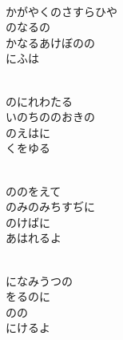 \documentclass[10pt,b5j]{tarticle} %
\begin{document}
\vspace{1.5em} %
\newcommand{\linespace}{0.5em} %
\newcommand{\blocksize}{0.5\hsize} %
\newcommand{\itemmargin}{6em} %
\begin{enumerate} %
    \setlength{\itemindent}{\itemmargin} %
    \begin{minipage}[c]{\blocksize}
    
        \vspace{\linespace}
        \item~\\
        かがやくのさすらひや\\
        のなるの\\
        かなるあけぼのの\\
        にふは
        
        \vspace{\linespace}
        \item~\\
        のにれわたる\\
        いのちののおきの\\
        のえはに\\
        くをゆる
        
        \vspace{\linespace}
        \item~\\
        ののをえて\\
        のみのみちすぢに\\
        のけばに\\
        あはれるよ
        
        \vspace{\linespace}
        \item~\\
        になみうつの\\
        をるのに\\
        のの\\
        にけるよ
    
    \end{minipage}
\end{enumerate} %
\end{document}
